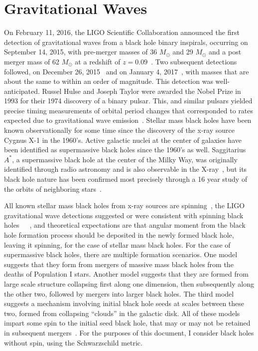 \section{Gravitational Waves}

On February 11, 2016, the LIGO Scientific Collaboration announced the
first detection of gravitational waves from a black hole binary
inspirals, occurring on September 14, 2015, with pre-merger masses of
36 $M_\odot$ and 29 $M_\odot$ and a post merger mass of 62 $M_\odot$
at a redshift of $z=0.09$~\cite{GW150914}. Two subsequent detections
followed, on December 26, 2015~\cite{GW151226} and on January 4,
2017~\cite{GW170104}, with masses that are about the same to within an order of magnitude. This detection was well-anticipated. Russel Hulse and Joseph Taylor were awarded the Nobel Prize in 1993 for their 1974 discovery of a binary pulsar. This, and similar pulsars yielded precise timing measurements of orbital period changes that corresponded to rates expected due to gravitational wave emission~\cite{hulsetaylor}. Stellar mass black holes have been known observationally for some time since the discovery of the x-ray source Cygnus X-1 in the 1960's. Active galactic nuclei at the center of galaxies have been identified as supermassive black holes since the 1960's as well. Saggitarius $A^*$, a supermassive black hole at the center of the Milky Way, was originally identified through radio astronomy and is also observable in the X-ray~\cite{sagastarmultiwavelength}, but its black hole nature has been confirmed most precisely through a 16 year study of the orbits of neighboring stars~\cite{sagastarorbits}. 

All known stellar mass black holes from x-ray sources are spinning~\cite{Bambi2017}, the LIGO gravitational wave detections suggested or were consistent with spinning black holes~\cite{GW150914}~\cite{GW151226}~\cite{GW170104}, and theoretical expectations are that angular moment from the black hole formation process should be deposited in the newly formed black hole, leaving it spinning, for the case of stellar mass black holes. For the case of supermassive black holes, there are multiple formation scenarios. One model suggests that they form from mergers of massive mass black holes from the deaths of Population I stars. Another model suggests that they are formed from large scale structure collapsing first along one dimension, then subsequently along the other two, followed by mergers into larger black holes. The third model suggests a mechanism involving initial black hole seeds at scales between these two, formed from collapsing ``clouds'' in the galactic disk. All of these models impart some spin to the initial seed black hole, that may or may not be retained in subsequent mergers~\cite{formationsmbh}. For the purposes of this document, I consider black holes without spin, using the Schwarzschild metric.


